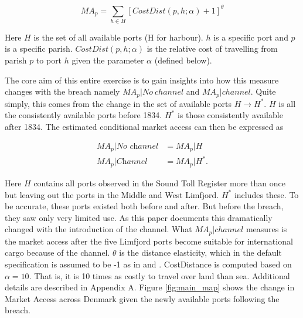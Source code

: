\documentclass[11pt]{article}
\begin{document}
\begin{equation}
\label{eq:MA2}
{MA}_p = \sum_{h \in H} [CostDist(p, h; \alpha) + 1]^\theta
\end{equation}

Here $H$ is the set of all available ports (H for harbour). $h$ is a specific port and $p$ is a specific parish. $CostDist(p, h; \alpha)$ is the relative cost of travelling from parish $p$ to port $h$ given the parameter $\alpha$ (defined below). 

The core aim of this entire exercise is to gain insights into how this measure changes with the breach namely ${MA}_p|No\:channel$ and ${MA}_p|channel$. Quite simply, this comes from the change in the set of available ports $H\rightarrow H^*$. $H$ is all the consistently available ports before 1834. $H^*$ is those consistently available after 1834. The estimated conditional market access can then be expressed as

\begin{equation}
\label{eq:MA3}
\begin{split}
{MA}_{p}|\textit{No channel} &= {MA}_{p}|H \\
{MA}_{p}|\textit{Channel} &= {MA}_{p}|H^*.
\end{split}
\end{equation}

Here $H$ contains all ports observed in the Sound Toll Register more than once but leaving out the ports in the Middle and West Limfjord. $H^*$ includes these. To be accurate, these ports existed both before and after. But before the breach, they saw only very limited use. As this paper documents this dramatically changed with the introduction of the channel. What ${MA}_{p}|channel$ measures is the market access after the five Limfjord ports become suitable for international cargo because of the channel. $\theta$ is the distance elasticity, which in the default specification is assumed to be -1 as in \cite{Harris1954} and \cite{rauch2022a}. CostDistance is computed based on $\alpha = 10$. That is, it is 10 times as costly to travel over land than sea. Additional details are described in Appendix A. Figure \ref{fig:main_map} shows the change in Market Access across Denmark given the newly available ports following the breach.

\FloatBarrier
\end{document}
